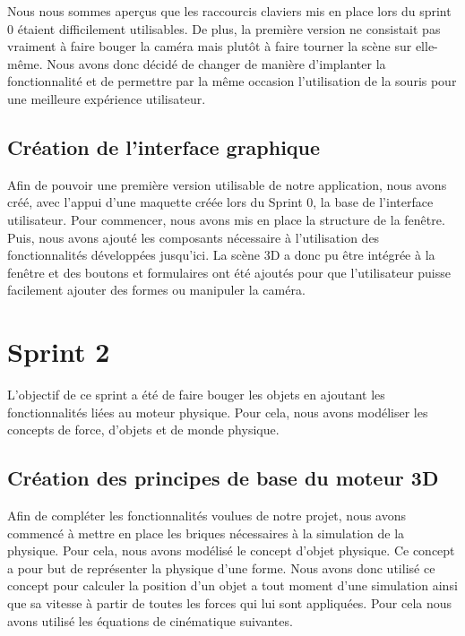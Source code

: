 \documentclass[11pt]{report}
\begin{document}
Nous nous sommes aperçus que les raccourcis claviers mis en place lors du sprint 0 étaient difficilement utilisables.
De plus, la première version ne consistait pas vraiment à faire bouger la caméra mais plutôt à faire tourner la scène
sur elle-même. Nous avons donc décidé de changer de manière d'implanter la fonctionnalité et de permettre par la même
occasion l'utilisation de la souris pour une meilleure expérience utilisateur.


\subsection{Création de l'interface graphique}

Afin de pouvoir une première version utilisable de notre application, nous avons créé, avec l'appui d'une maquette
créée lors du Sprint 0, la base de l'interface utilisateur. Pour commencer, nous avons mis en place la structure de la
fenêtre. Puis, nous avons ajouté les composants nécessaire à l'utilisation des fonctionnalités développées jusqu'ici.
La scène 3D a donc pu être intégrée à la fenêtre et des boutons et formulaires ont été ajoutés pour que l'utilisateur
puisse facilement ajouter des formes ou manipuler la caméra.


\section{Sprint 2}

L'objectif de ce sprint a été de faire bouger les objets en ajoutant les fonctionnalités liées au moteur physique. Pour cela, nous avons modéliser les concepts de force, d'objets et de monde physique.

\subsection{Création des principes de base du moteur 3D}

Afin de compléter les fonctionnalités voulues de notre projet, nous avons commencé à mettre en place les briques
nécessaires à la simulation de la physique. Pour cela, nous avons modélisé le concept d'objet physique. Ce concept
a pour but de représenter la physique d'une forme. Nous avons donc utilisé ce concept pour calculer la position
d'un objet a tout moment d'une simulation ainsi que sa vitesse à partir de toutes les forces qui lui sont appliquées.
Pour cela nous avons utilisé les équations de cinématique suivantes.
\end{document}

